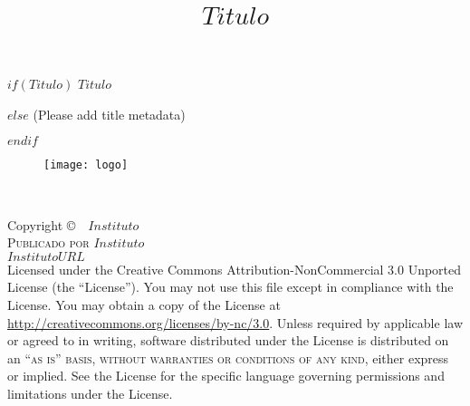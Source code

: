 \documentclass[11pt,fleqn]{book} %
\title{$Titulo$}
\begin{document}
\spanishsignitems


\begingroup
\thispagestyle{empty}
\centering
\vspace*{9cm}
\par\normalfont\fontsize{35}{35}\sffamily\selectfont
$if(Titulo)$
$Titulo$\par %
$else$
(Please add title metadata)\par %
$endif$


\vspace*{1cm}

\begin{figure}[h]
  \centering
    \texttt{[image: logo]}
\end{figure}

\endgroup


\newpage
~\vfill
\thispagestyle{empty}

\noindent Copyright \copyright\ \the\year \ $Instituto$\\ %

\noindent \textsc{Publicado por $Instituto$}\\ %

\noindent \textsc{$InstitutoURL$}\\ %

\noindent Licensed under the Creative Commons Attribution-NonCommercial 3.0 Unported License (the ``License''). You may not use this file except in compliance with the License. You may obtain a copy of the License at \url{http://creativecommons.org/licenses/by-nc/3.0}. Unless required by applicable law or agreed to in writing, software distributed under the License is distributed on an \textsc{``as is'' basis, without warranties or conditions of any kind}, either express or implied. See the License for the specific language governing permissions and limitations under the License.\\ %
\end{document}
